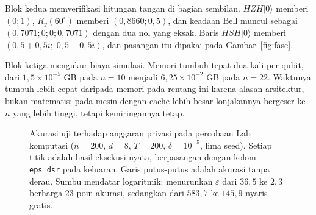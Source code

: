 Blok kedua memverifikasi hitungan tangan di bagian sembilan. $HZH|0\rangle$ memberi
$(0;1)$, $R_y(60^\circ)$ memberi $(0{,}8660;0{,}5)$, dan keadaan Bell muncul sebagai
$(0{,}7071;0;0;0{,}7071)$ dengan dua nol yang eksak. Baris $HSH|0\rangle$ memberi
$(0{,}5+0{,}5i;\;0{,}5-0{,}5i)$, dan pasangan itu dipakai pada
Gambar~\ref{fig:fase}.

Blok ketiga mengukur biaya simulasi. Memori tumbuh tepat dua kali per qubit, dari
$1{,}5\times10^{-5}$ GB pada $n=10$ menjadi $6{,}25\times10^{-2}$ GB pada $n=22$.
Waktunya tumbuh lebih cepat daripada memori pada rentang ini karena alasan arsitektur,
bukan matematis; pada mesin dengan cache lebih besar lonjakannya bergeser ke $n$ yang
lebih tinggi, tetapi kemiringannya tetap.

\begin{figure}
\centering
{}
\caption{Akurasi uji terhadap anggaran privasi pada percobaan Lab komputasi ($n=200$,
$d=8$, $T=200$, $\delta=10^{-5}$, lima seed). Setiap titik adalah hasil eksekusi nyata,
berpasangan dengan kolom \texttt{eps\_dsr} pada keluaran. Garis putus-putus adalah
akurasi tanpa derau. Sumbu mendatar logaritmik: menurunkan $\varepsilon$ dari $36{,}5$
ke $2{,}3$ berharga $23$ poin akurasi, sedangkan dari $583{,}7$ ke $145{,}9$ nyaris
gratis.}
\label{fig:tradeoff}
\end{figure}

